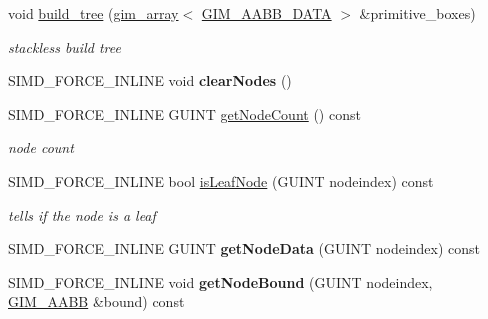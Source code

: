 \begin{DoxyCompactItemize}
\item 
void \hyperlink{class_g_i_m___b_o_x___t_r_e_e_af76fa1d2f5e20c8979120fa72cf7575f}{build\+\_\+tree} (\hyperlink{classgim__array}{gim\+\_\+array}$<$ \hyperlink{struct_g_i_m___a_a_b_b___d_a_t_a}{G\+I\+M\+\_\+\+A\+A\+B\+B\+\_\+\+D\+A\+T\+A} $>$ \&primitive\+\_\+boxes)
\begin{DoxyCompactList}\small\item\em stackless build tree \end{DoxyCompactList}\item 
\hypertarget{class_g_i_m___b_o_x___t_r_e_e_aa016c5ef3669d464ed15eb18b7308b62}{S\+I\+M\+D\+\_\+\+F\+O\+R\+C\+E\+\_\+\+I\+N\+L\+I\+N\+E void {\bfseries clear\+Nodes} ()}\label{class_g_i_m___b_o_x___t_r_e_e_aa016c5ef3669d464ed15eb18b7308b62}

\item 
\hypertarget{class_g_i_m___b_o_x___t_r_e_e_aca02d76bac47e019fd728a5871951d14}{S\+I\+M\+D\+\_\+\+F\+O\+R\+C\+E\+\_\+\+I\+N\+L\+I\+N\+E G\+U\+I\+N\+T \hyperlink{class_g_i_m___b_o_x___t_r_e_e_aca02d76bac47e019fd728a5871951d14}{get\+Node\+Count} () const }\label{class_g_i_m___b_o_x___t_r_e_e_aca02d76bac47e019fd728a5871951d14}

\begin{DoxyCompactList}\small\item\em node count \end{DoxyCompactList}\item 
\hypertarget{class_g_i_m___b_o_x___t_r_e_e_acdbffa778ffd8cc69f5c17f5540c9fd1}{S\+I\+M\+D\+\_\+\+F\+O\+R\+C\+E\+\_\+\+I\+N\+L\+I\+N\+E bool \hyperlink{class_g_i_m___b_o_x___t_r_e_e_acdbffa778ffd8cc69f5c17f5540c9fd1}{is\+Leaf\+Node} (G\+U\+I\+N\+T nodeindex) const }\label{class_g_i_m___b_o_x___t_r_e_e_acdbffa778ffd8cc69f5c17f5540c9fd1}

\begin{DoxyCompactList}\small\item\em tells if the node is a leaf \end{DoxyCompactList}\item 
\hypertarget{class_g_i_m___b_o_x___t_r_e_e_a67325a5db7d87791068ef278e772f756}{S\+I\+M\+D\+\_\+\+F\+O\+R\+C\+E\+\_\+\+I\+N\+L\+I\+N\+E G\+U\+I\+N\+T {\bfseries get\+Node\+Data} (G\+U\+I\+N\+T nodeindex) const }\label{class_g_i_m___b_o_x___t_r_e_e_a67325a5db7d87791068ef278e772f756}

\item 
\hypertarget{class_g_i_m___b_o_x___t_r_e_e_afed3ac69e87861412130e5680bdc3c95}{S\+I\+M\+D\+\_\+\+F\+O\+R\+C\+E\+\_\+\+I\+N\+L\+I\+N\+E void {\bfseries get\+Node\+Bound} (G\+U\+I\+N\+T nodeindex, \hyperlink{class_g_i_m___a_a_b_b}{G\+I\+M\+\_\+\+A\+A\+B\+B} \&bound) const }\label{class_g_i_m___b_o_x___t_r_e_e_afed3ac69e87861412130e5680bdc3c95}


\end{DoxyCompactItemize}
